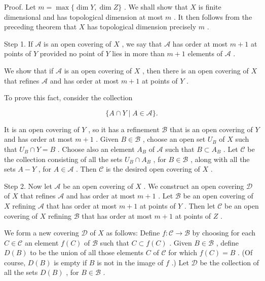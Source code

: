 Proof. Let \(m = \max \{ \dim Y,\dim Z\}\) . We shall show that \(X\) is finite dimensional and has topological dimension at most \(m\) . It then follows from the preceding theorem that \(X\) has topological dimension precisely \(m\) .

Step 1. If \(\mathcal{A}\) is an open covering of \(X\) , we say that \(\mathcal{A}\) has order at most \(m + 1\) at points of \(Y\) provided no point of \(Y\) lies in more than \(m + 1\) elements of \(\mathcal{A}\) .

We show that if \(\mathcal{A}\) is an open covering of \(X\) , then there is an open covering of \(X\) that refines \(\mathcal{A}\) and has order at most \(m + 1\) at points of \(Y\) .

To prove this fact, consider the collection

\[
\{ A \cap  Y \mid  A \in  \mathcal{A}\} .
\]

It is an open covering of \(Y\) , so it has a refinement \(\mathcal{B}\) that is an open covering of \(Y\) and has order at most \(m + 1\) . Given \(B \in  \mathcal{B}\) , choose an open set \({U}_{B}\) of \(X\) such that \({U}_{B} \cap  Y = B\) . Choose also an element \({A}_{B}\) of \(\mathcal{A}\) such that \(B \subset  {A}_{B}\) . Let \(\mathcal{C}\) be the collection consisting of all the sets \({U}_{B} \cap  {A}_{B}\) , for \(B \in  \mathcal{B}\) , along with all the sets \(A - Y\) , for \(A \in  \mathcal{A}\) . Then \(\mathcal{C}\) is the desired open covering of \(X\) .

Step 2. Now let \(\mathcal{A}\) be an open covering of \(X\) . We construct an open covering \(\mathcal{D}\) of \(X\) that refines \(\mathcal{A}\) and has order at most \(m + 1\) . Let \(\mathcal{B}\) be an open covering of \(X\) refining \(\mathcal{A}\) that has order at most \(m + 1\) at points of \(Y\) . Then let \(\mathcal{C}\) be an open covering of \(X\) refining \(\mathcal{B}\) that has order at most \(m + 1\) at points of \(Z\) .

We form a new covering \(\mathcal{D}\) of \(X\) as follows: Define \(f : \mathcal{C} \rightarrow  \mathcal{B}\) by choosing for each \(C \in  \mathcal{C}\) an element \(f\left( C\right)\) of \(\mathcal{B}\) such that \(C \subset  f\left( C\right)\) . Given \(B \in  \mathcal{B}\) , define \(D\left( B\right)\) to be the union of all those elements \(C\) of \(\mathcal{C}\) for which \(f\left( C\right)  = B\) . (Of course, \(D\left( B\right)\) is empty if \(B\) is not in the image of \(f\) .) Let \(\mathcal{D}\) be the collection of all the sets \(D\left( B\right)\) , for \(B \in  \mathcal{B}\) .

